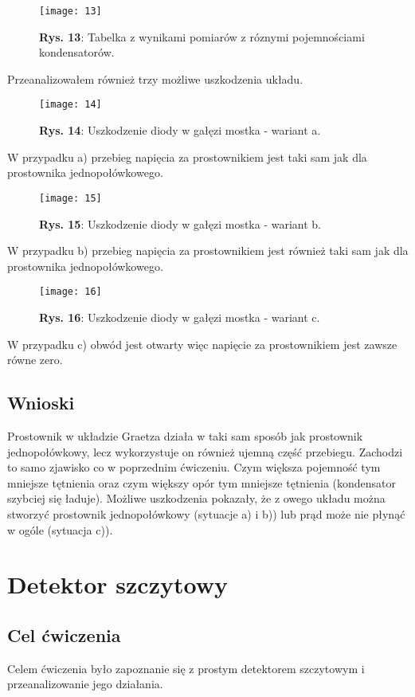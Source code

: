 \documentclass[11pt]{article}
\begin{document}
$$\begin{figure}[H]
\centering
\texttt{[image: 13]}
\caption*{\textbf{Rys. 13}: Tabelka z wynikami pomiarów z róznymi pojemnościami kondensatorów. }
\end{figure}
\noindent Przeanalizowałem również trzy możliwe uszkodzenia układu.
\begin{figure}[H]
\centering
\texttt{[image: 14]}
\caption*{\textbf{Rys. 14}: Uszkodzenie diody w gałęzi mostka - wariant a.}
\end{figure}
\noindent W przypadku a) przebieg napięcia za prostownikiem jest taki sam jak dla prostownika jednopołówkowego.
\begin{figure}[H]
\centering
\texttt{[image: 15]}
\caption*{\textbf{Rys. 15}: Uszkodzenie diody w gałęzi mostka - wariant b.}
\end{figure}
\noindent W przypadku b) przebieg napięcia za prostownikiem jest również taki sam jak dla prostownika jednopołówkowego.
\begin{figure}[H]
\centering
\texttt{[image: 16]}
\caption*{\textbf{Rys. 16}: Uszkodzenie diody w gałęzi mostka - wariant c.}
\end{figure}
\noindent W przypadku c) obwód jest otwarty więc napięcie za prostownikiem jest zawsze równe zero.
\subsection{Wnioski}
Prostownik w układzie Graetza działa w taki sam sposób jak prostownik jednopołówkowy, lecz wykorzystuje on również ujemną część przebiegu. Zachodzi to samo zjawisko co w poprzednim ćwiczeniu. Czym większa pojemność tym mniejsze tętnienia oraz czym większy opór tym mniejsze tętnienia (kondensator szybciej się 
ładuje). Możliwe uszkodzenia pokazały, że z owego układu można stworzyć prostownik jednopołówkowy (sytuacje a) i b)) lub prąd może nie płynąć w ogóle (sytuacja c)).
\section{Detektor szczytowy}
\subsection{Cel ćwiczenia}
Celem ćwiczenia było zapoznanie się z prostym detektorem szczytowym i przeanalizowanie jego działania.
\end{document}

